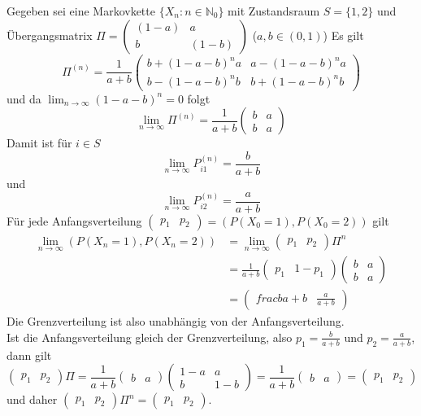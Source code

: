 \documentclass[a4paper,12pt]{article}
\begin{document}
\begin{tcolorbox}[breakable, colframe=blue, colback=white, title=Beispiel 11]
Gegeben sei eine Markovkette $\{X_n: n \in \mathbb{N}_0\}$ mit Zustandsraum 
$S = \{1,2\}$ und Übergangsmatrix $\Pi = \begin{pmatrix} (1-a) & a \\ b & (1-b) \end{pmatrix}$ ($a,b \in (0,1)$)
Es gilt
$$
\Pi^{(n)} = \frac{1}{a+b}\begin{pmatrix} 
b + (1-a-b)^na & a-(1-a-b)^na \\
b - (1-a-b)^nb & b + (1-a-b)^nb
\end{pmatrix}
$$
und da $\lim_{n \to \infty}(1-a-b)^n = 0$ folgt
$$
\lim_{n \to \infty}\Pi^{(n)} = \frac{1}{a+b} \begin{pmatrix}b & a \\ b & a \end{pmatrix}
$$
Damit ist für $i \in S$
$$
\lim_{n \to \infty}P_{i1}^{(n)} = \frac{b}{a+b}
$$
und
$$
\lim_{n \to \infty}P_{i2}^{(n)} = \frac{a}{a+b}
$$
Für jede Anfangsverteilung $\begin{pmatrix}p_1 & p_2 \end{pmatrix} = (P(X_0 = 1), P(X_0 = 2))$ gilt
\begin{align*}
\lim_{n \to \infty} (P(X_n = 1), P(X_n = 2)) & = \lim_{n \to \infty}\begin{pmatrix}p_1 & p_2 \end{pmatrix}\Pi^n \\
& = \frac{1}{a+b}\begin{pmatrix}p_1 & 1-p_1 \end{pmatrix} \begin{pmatrix} b & a \\ b & a \end{pmatrix} \\
& = \begin{pmatrix}frac{b}{a+b} & \frac{a}{a+b} \end{pmatrix}
\end{align*}
Die Grenzverteilung ist also unabhängig von der Anfangsverteilung.\\
Ist die Anfangsverteilung gleich der Grenzverteilung, also
$p_1 = \frac{b}{a+b}$ und $p_2 = \frac{a}{a+b}$, dann gilt 
$$
\begin{pmatrix}p_1 & p_2 \end{pmatrix}  \Pi = \frac{1}{a+b} \begin{pmatrix}b & a   \end{pmatrix}\begin{pmatrix}1-a & a \\ b & 1-b \end{pmatrix} =\frac{1}{a+b}\begin{pmatrix}b & a   \end{pmatrix} = \begin{pmatrix}p_1 & p_2 \end{pmatrix} 
$$
und daher $\begin{pmatrix}p_1 & p_2 \end{pmatrix}  \Pi^n = \begin{pmatrix}p_1 & p_2 \end{pmatrix} $.
\end{tcolorbox}
\end{document}
